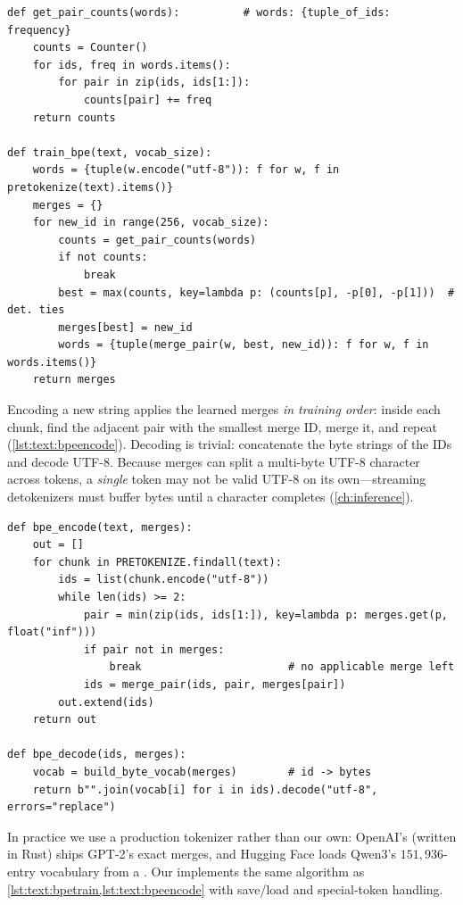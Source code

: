 \begin{lstlisting}[caption={Naive byte-level BPE training (Lab 3, Part B).},label={lst:text:bpetrain}]
def get_pair_counts(words):          # words: {tuple_of_ids: frequency}
    counts = Counter()
    for ids, freq in words.items():
        for pair in zip(ids, ids[1:]):
            counts[pair] += freq
    return counts

def train_bpe(text, vocab_size):
    words = {tuple(w.encode("utf-8")): f for w, f in pretokenize(text).items()}
    merges = {}
    for new_id in range(256, vocab_size):
        counts = get_pair_counts(words)
        if not counts:
            break
        best = max(counts, key=lambda p: (counts[p], -p[0], -p[1]))  # det. ties
        merges[best] = new_id
        words = {tuple(merge_pair(w, best, new_id)): f for w, f in words.items()}
    return merges
\end{lstlisting}

Encoding a new string applies the learned merges \emph{in training order}: inside each chunk,
find the adjacent pair with the smallest merge ID, merge it, and repeat
(\cref{lst:text:bpeencode}). Decoding is trivial: concatenate the byte strings of the IDs and decode
UTF-8. Because merges can split a multi-byte UTF-8 character across tokens, a \emph{single}
token may not be valid UTF-8 on its own---streaming detokenizers must buffer bytes until a
character completes (\cref{ch:inference}).

\begin{lstlisting}[caption={BPE encoding by merge rank; decoding by byte concatenation.},label={lst:text:bpeencode}]
def bpe_encode(text, merges):
    out = []
    for chunk in PRETOKENIZE.findall(text):
        ids = list(chunk.encode("utf-8"))
        while len(ids) >= 2:
            pair = min(zip(ids, ids[1:]), key=lambda p: merges.get(p, float("inf")))
            if pair not in merges:
                break                       # no applicable merge left
            ids = merge_pair(ids, pair, merges[pair])
        out.extend(ids)
    return out

def bpe_decode(ids, merges):
    vocab = build_byte_vocab(merges)        # id -> bytes
    return b"".join(vocab[i] for i in ids).decode("utf-8", errors="replace")
\end{lstlisting}

In practice we use a production tokenizer rather than our own: OpenAI's 
(written in Rust) ships GPT-2's exact merges, and Hugging Face  loads Qwen3's
$151{,}936$-entry vocabulary from a . Our 
implements the same algorithm as \cref{lst:text:bpetrain,lst:text:bpeencode} with
save/load and special-token handling.

